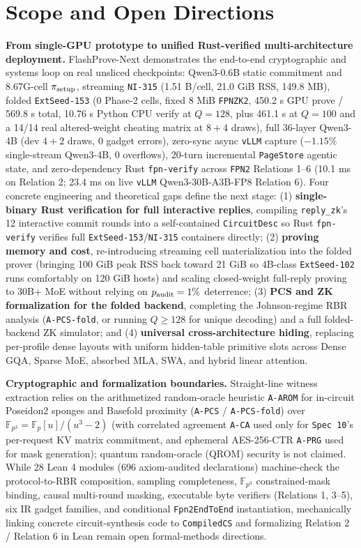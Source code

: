 \documentclass[10pt]{article}
\begin{document}
\section{Scope and Open Directions}
\textbf{From single-GPU prototype to unified Rust-verified multi-architecture deployment.} FlashProve-Next demonstrates the end-to-end cryptographic and systems loop on real unsliced checkpoints: Qwen3-0.6B static commitment and 8.67G-cell $\pi_{\rm setup}$, streaming \texttt{NI-315} (1.51 B/cell, 21.0 GiB RSS, 149.8 MB), folded \texttt{ExtSeed-153} (0 Phase-2 cells, fixed 8 MiB \texttt{FPNZK2}, 450.2 s GPU prove / 569.8 s total, 10.76 s Python CPU verify at $Q=128$, plus 461.1 s at $Q=100$ and a 14/14 real altered-weight cheating matrix at $8+4$ draws), full 36-layer Qwen3-4B (dev $4+2$ draws, 0 gadget errors), zero-sync async \texttt{vLLM} capture ($-1.15\%$ single-stream Qwen3-4B, 0 overflows), 20-turn incremental \texttt{PageStore} agentic state, and zero-dependency Rust \texttt{fpn-verify} across \texttt{FPN2} Relations 1--6 (10.1 ms on Relation 2; 23.4 ms on live \texttt{vLLM} Qwen3-30B-A3B-FP8 Relation 6). Four concrete engineering and theoretical gaps define the next stage: (1) \textbf{single-binary Rust verification for full interactive replies}, compiling \texttt{reply\_\allowbreak{}zk}'s 12 interactive commit rounds into a self-contained \texttt{CircuitDesc} so Rust \texttt{fpn-verify} verifies full \texttt{ExtSeed-153}/\texttt{NI-315} containers directly; (2) \textbf{proving memory and cost}, re-introducing streaming cell materialization into the folded prover (bringing 100 GiB peak RSS back toward 21 GiB so 4B-class \texttt{ExtSeed-102} runs comfortably on 120 GiB hosts) and scaling closed-weight full-reply proving to 30B+ MoE without relying on $p_{\rm audit} = 1\%$ deterrence; (3) \textbf{PCS and ZK formalization for the folded backend}, completing the Johnson-regime RBR analysis (\texttt{A-PCS-fold}, or running $Q \ge 128$ for unique decoding) and a full folded-backend ZK simulator; and (4) \textbf{universal cross-architecture hiding}, replacing per-profile dense layouts with uniform hidden-table primitive slots across Dense GQA, Sparse MoE, absorbed MLA, SWA, and hybrid linear attention.

\textbf{Cryptographic and formalization boundaries.} Straight-line witness extraction relies on the arithmetized random-oracle heuristic \texttt{A-AROM} for in-circuit Poseidon2 sponges and Basefold proximity (\texttt{A-PCS} / \texttt{A-PCS-fold}) over $\mathbb F_{p^3}=\mathbb F_p[u]/(u^3-2)$ (with correlated agreement \texttt{A-CA} used only for \texttt{Spec 10}'s per-request KV matrix commitment, and ephemeral AES-256-CTR \texttt{A-PRG} used for mask generation); quantum random-oracle (QROM) security is not claimed. While 28 Lean 4 modules (696 axiom-audited declarations) machine-check the protocol-to-RBR composition, sampling completeness, $\mathbb F_{p^3}$ constrained-mask binding, causal multi-round masking, executable byte verifiers (Relations 1, 3--5), six IR gadget families, and conditional \texttt{Fpn2EndToEnd} instantiation, mechanically linking concrete circuit-synthesis code to \texttt{CompiledCS} and formalizing Relation 2 / Relation 6 in Lean remain open formal-methods directions.
\end{document}
